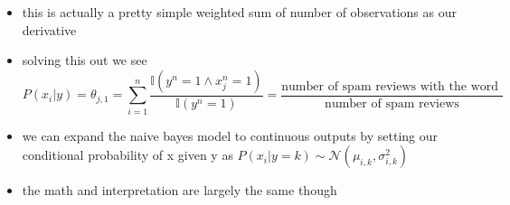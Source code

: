\documentclass{article}
\begin{document}
\begin{itemize}
\item this is actually a pretty simple weighted sum of number of observations as our derivative
\item solving this out we see $$P(x_i|y)=\theta_{j,1}=\sum_{i=1}^{n}\frac{\mathbb{I}(y^{n}=1\land x_{j}^n=1)}{\mathbb{I}(y^{n}=1)}=\frac{\text{number of spam reviews with the word }}{\text{number of spam reviews}}$$
\item we can expand the naive bayes model to continuous outputs  by setting our conditional probability of x given y as $P(x_{i}|y=k)\sim\mathcal{N}(\mu_{i,k}, \sigma_{i,k}^{2})$
\item the math and interpretation are largely the same though 
\end{itemize}
\end{document}
